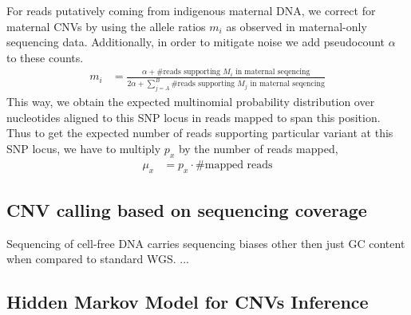 For reads putatively coming from indigenous maternal DNA, we correct for maternal CNVs by using the allele ratios $m_i$ as observed in maternal-only sequencing data. Additionally, in order to mitigate noise we add pseudocount $\alpha$ to these counts.
\begin{align*}
m_i &= \frac{\alpha + \# \text{reads supporting }M_i\text{ in maternal seqencing}}{2\alpha + \sum_{j=A}^{B}\# \text{reads supporting }M_j\text{ in maternal seqencing}}
\end{align*}
This way, we obtain the expected multinomial probability distribution over nucleotides aligned to this SNP locus in reads mapped to span this position. Thus to get the expected number of reads supporting particular variant at this SNP locus, we have to multiply $p_x$ by the number of reads mapped,
\begin{align*}
\mu_x &= p_x \cdot \#\text{mapped reads}
\end{align*}


\subsection{CNV calling based on sequencing coverage}
Sequencing of cell-free DNA carries sequencing biases other then just GC content when compared to standard WGS. ... \cite{srinivasan2013}

\subsection{Hidden Markov Model for CNVs Inference}\label{ss:hmm}


